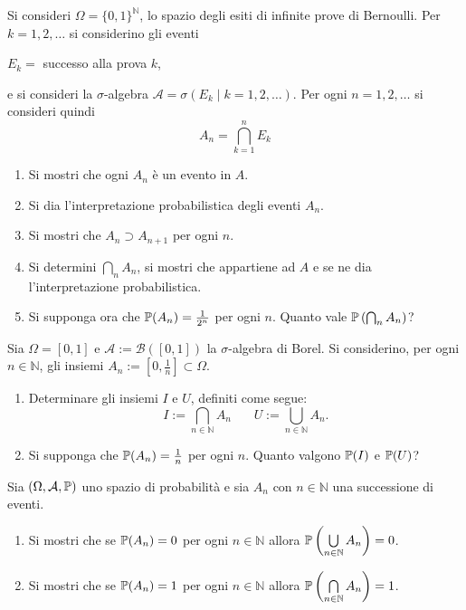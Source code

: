 Si consideri $\Omega =\{0,1\}^{\mathbb{N}}$, lo spazio degli esiti di infinite prove di Bernoulli. Per $k=1,2,\dots $ si considerino gli eventi
\begin{center}
$E_{k} =$ successo alla prova $k$,
\end{center}
e si consideri la $\sigma $-algebra $\mathcal{A} =\sigma ( E_{k} \mid k=1,2,\dots )$. Per ogni $n=1,2,\dots $ si consideri quindi
\begin{equation*}
A_{n} =\bigcap _{k=1}^{n} E_{k}
\end{equation*}
\begin{enumerate}
\item Si mostri che ogni $A_{n}$ è un evento in $A$.
\item Si dia l'interpretazione probabilistica degli eventi $A_{n}$.
\item Si mostri che $A_{n} \supset A_{n+1}$ per ogni $n$.
\item Si determini $\bigcap _{n} A_{n}$, si mostri che appartiene ad $A$ e se ne dia l'interpretazione probabilistica.
\item Si supponga ora che $\mathbb{P}( A_{n}) =\frac{1}{2^{n}}$ per ogni $n$. Quanto vale $\mathbb{P}\left(\bigcap_{n} A_{n}\right)$?
\end{enumerate}
\Esercizio{}

Sia $\Omega =[ 0,1]$ e $\mathcal{A} :=\mathcal{B}([ 0,1])$ la $\sigma $-algebra di Borel. Si considerino, per ogni $n\in \mathbb{N}$, gli insiemi $A_{n} :=\left[ 0,\frac{1}{n}\right] \subset \Omega $.
\begin{enumerate}
\item Determinare gli insiemi $I$ e $U$, definiti come segue:\begin{equation*}
I:=\bigcap _{n\in \mathbb{N}} A_{n} \ \ \ \ \ \ \ \ U:=\bigcup _{n\in \mathbb{N}} A_{n} .
\end{equation*}
\item Si supponga che $\mathbb{P}( A_{n}) =\frac{1}{n}$ per ogni $n$. Quanto valgono $\mathbb{P}( I)$ e $\mathbb{P}( U)$?
\end{enumerate}
\Esercizio{$\star$}

Sia $( \Omega ,\mathcal{A} ,\mathbb{P})$ uno spazio di probabilità e sia $A_{n}$ con $n\in \mathbb{N}$ una successione di eventi.
\begin{enumerate}
\item Si mostri che se $\mathbb{P}( A_{n}) =0$ per ogni $n\in \mathbb{N}$ allora $\mathbb{P}\left(\bigcup\limits _{n\in \mathbb{N}} A_{n}\right) =0$.
\item Si mostri che se $\mathbb{P}( A_{n}) =1$ per ogni $n\in \mathbb{N}$ allora $\mathbb{P}\left(\bigcap\limits _{n\in \mathbb{N}} A_{n}\right) =1$.
\end{enumerate}
\Esercizio{$\star$}

